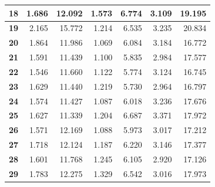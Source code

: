 \documentclass[12pt]{article}
\begin{document}
\begin{table}[!htbp]
{\begin{tabular}{crrrrr|r|}
\multicolumn{1}{|c|}{\textbf{18}} & \multicolumn{1}{r|}{1.686} & \multicolumn{1}{r|}{12.092} & \multicolumn{1}{r|}{1.573} & \multicolumn{1}{r|}{6.774} & 3.109 & 19.195 \\ \hline
\multicolumn{1}{|c|}{\textbf{19}} & \multicolumn{1}{r|}{2.165} & \multicolumn{1}{r|}{15.772} & \multicolumn{1}{r|}{1.214} & \multicolumn{1}{r|}{6.535} & 3.235 & 20.834 \\ \hline
\multicolumn{1}{|c|}{\textbf{20}} & \multicolumn{1}{r|}{1.864} & \multicolumn{1}{r|}{11.986} & \multicolumn{1}{r|}{1.069} & \multicolumn{1}{r|}{6.084} & 3.184 & 16.772 \\ \hline
\multicolumn{1}{|c|}{\textbf{21}} & \multicolumn{1}{r|}{1.591} & \multicolumn{1}{r|}{11.439} & \multicolumn{1}{r|}{1.100} & \multicolumn{1}{r|}{5.835} & 2.984 & 17.577 \\ \hline
\multicolumn{1}{|c|}{\textbf{22}} & \multicolumn{1}{r|}{1.546} & \multicolumn{1}{r|}{11.660} & \multicolumn{1}{r|}{1.122} & \multicolumn{1}{r|}{5.774} & 3.124 & 16.745 \\ \hline
\multicolumn{1}{|c|}{\textbf{23}} & \multicolumn{1}{r|}{1.629} & \multicolumn{1}{r|}{11.440} & \multicolumn{1}{r|}{1.219} & \multicolumn{1}{r|}{5.730} & 2.964 & 16.797 \\ \hline
\multicolumn{1}{|c|}{\textbf{24}} & \multicolumn{1}{r|}{1.574} & \multicolumn{1}{r|}{11.427} & \multicolumn{1}{r|}{1.087} & \multicolumn{1}{r|}{6.018} & 3.236 & 17.676 \\ \hline
\multicolumn{1}{|c|}{\textbf{25}} & \multicolumn{1}{r|}{1.627} & \multicolumn{1}{r|}{11.339} & \multicolumn{1}{r|}{1.204} & \multicolumn{1}{r|}{6.687} & 3.371 & 17.972 \\ \hline
\multicolumn{1}{|c|}{\textbf{26}} & \multicolumn{1}{r|}{1.571} & \multicolumn{1}{r|}{12.169} & \multicolumn{1}{r|}{1.088} & \multicolumn{1}{r|}{5.973} & 3.017 & 17.212 \\ \hline
\multicolumn{1}{|c|}{\textbf{27}} & \multicolumn{1}{r|}{1.718} & \multicolumn{1}{r|}{12.124} & \multicolumn{1}{r|}{1.187} & \multicolumn{1}{r|}{6.220} & 3.146 & 17.377 \\ \hline
\multicolumn{1}{|c|}{\textbf{28}} & \multicolumn{1}{r|}{1.601} & \multicolumn{1}{r|}{11.768} & \multicolumn{1}{r|}{1.245} & \multicolumn{1}{r|}{6.105} & 2.920 & 17.126 \\ \hline
\multicolumn{1}{|c|}{\textbf{29}} & \multicolumn{1}{r|}{1.783} & \multicolumn{1}{r|}{12.275} & \multicolumn{1}{r|}{1.329} & \multicolumn{1}{r|}{6.542} & 3.016 & 17.973 \\ \hline

\end{tabular}}
\end{table}
\end{document}
